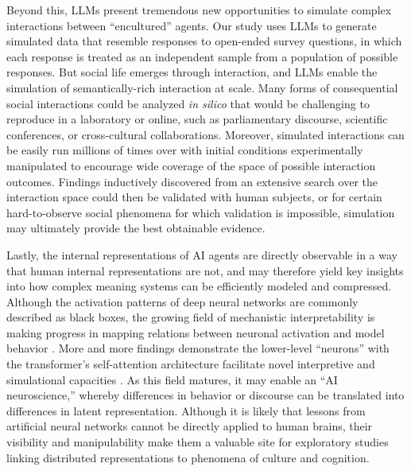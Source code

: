 \documentclass{article} %
\begin{document}
Beyond this, LLMs present tremendous new opportunities to simulate
complex interactions between ``encultured'' agents. Our study uses LLMs
to generate simulated data that resemble responses to open-ended survey
questions, in which each response is treated as an independent sample
from a population of possible responses. But social life emerges through
interaction, and LLMs enable the simulation of semantically-rich
interaction at scale. Many forms of consequential social interactions
could be analyzed \emph{in silico} that would be challenging to
reproduce in a laboratory or online, such as parliamentary discourse,
scientific conferences, or cross-cultural collaborations. Moreover,
simulated interactions can be easily run millions of times over with
initial conditions experimentally manipulated to encourage wide coverage
of the space of possible interaction outcomes. Findings inductively
discovered from an extensive search over the interaction space could
then be validated with human subjects, or for certain hard-to-observe
social phenomena for which validation is impossible, simulation may
ultimately provide the best obtainable evidence.

Lastly, the internal representations of AI agents are directly
observable in a way that human internal representations are not, and may
therefore yield key insights into how complex meaning systems can be
efficiently modeled and compressed. Although the activation patterns of
deep neural networks are commonly described as black boxes, the growing
field of mechanistic interpretability is making progress in mapping
relations between neuronal activation and model behavior
\parencite{Bills2023-db, Elhage2022-bh}. More and more findings demonstrate the lower-level
``neurons'' with the transformer's self-attention architecture
facilitate novel interpretive and simulational capacities
\parencite{Hendel2023-ij}. As this field matures, it may enable
an ``AI neuroscience,'' whereby differences in behavior or discourse can
be translated into differences in latent representation. Although it is
likely that lessons from artificial neural networks cannot be directly
applied to human brains, their visibility and manipulability make them a
valuable site for exploratory studies linking distributed
representations to phenomena of culture and cognition.
\end{document}
